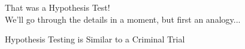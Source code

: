 \documentclass[handout]{beamer}
\begin{document}

\begin{frame}
	\begin{center}
	\huge That was a Hypothesis Test!\\
	\normalsize We'll go through the details in a moment, but first an analogy...
	\end{center}
\end{frame}




\begin{frame}
	\begin{center}
	\huge Hypothesis Testing is Similar to a Criminal Trial
	\end{center}
\end{frame}

\end{document}
